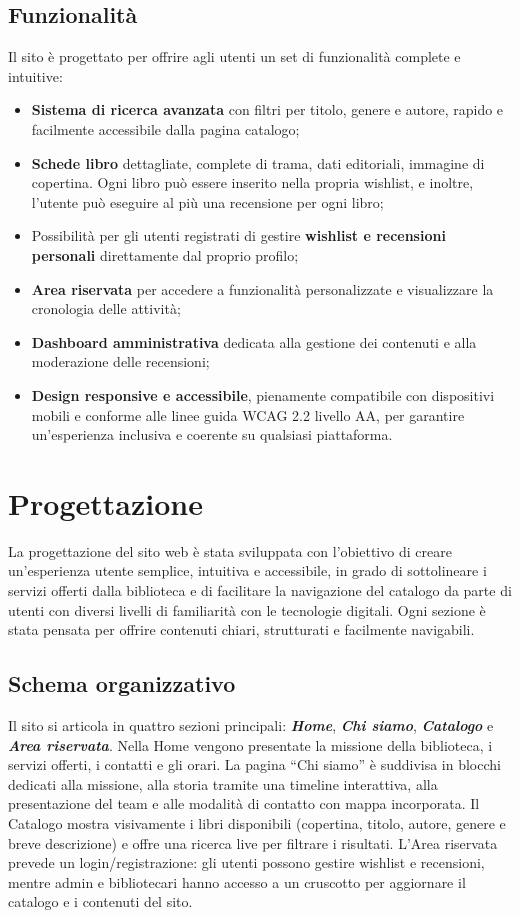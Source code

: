 \documentclass{article}
\begin{document}
\subsection{Funzionalità}
Il sito è progettato per offrire agli utenti un set di funzionalità complete e intuitive:
\begin{itemize}
    \item \textbf{Sistema di ricerca avanzata} con filtri per titolo, genere e autore, rapido e facilmente accessibile dalla pagina catalogo;
    \item \textbf{Schede libro} dettagliate, complete di trama, dati editoriali, immagine di copertina. Ogni libro può essere inserito nella propria wishlist, e inoltre, l'utente può eseguire al più una recensione per ogni libro;
    \item Possibilità per gli utenti registrati di gestire \textbf{wishlist e recensioni personali} direttamente dal proprio profilo;
    \item \textbf{Area riservata} per accedere a funzionalità personalizzate e visualizzare la cronologia delle attività;
    \item \textbf{Dashboard amministrativa} dedicata alla gestione dei contenuti e alla moderazione delle recensioni;
    \item \textbf{Design responsive e accessibile}, pienamente compatibile con dispositivi mobili e conforme alle linee guida WCAG 2.2 livello AA, per garantire un'esperienza inclusiva e coerente su qualsiasi piattaforma.
\end{itemize}


\section{Progettazione}
La progettazione del sito web è stata sviluppata con l'obiettivo di creare un'esperienza utente semplice, intuitiva e accessibile, in grado di sottolineare i servizi offerti dalla biblioteca e di facilitare la navigazione del catalogo da parte di utenti con diversi livelli di familiarità con le tecnologie digitali.
Ogni sezione è stata pensata per offrire contenuti chiari, strutturati e facilmente navigabili.


\subsection{Schema organizzativo}
Il sito si articola in quattro sezioni principali: \emph{\textbf{Home}}, \emph{\textbf{Chi siamo}}, \emph{\textbf{Catalogo}} e \emph{\textbf{Area riservata}}.  
Nella Home vengono presentate la missione della biblioteca, i servizi offerti, i contatti e gli orari.  
La pagina “Chi siamo” è suddivisa in blocchi dedicati alla missione, alla storia tramite una timeline interattiva, alla presentazione del team e alle modalità di contatto con mappa incorporata.  
Il Catalogo mostra visivamente i libri disponibili (copertina, titolo, autore, genere e breve descrizione) e offre una ricerca live per filtrare i risultati.  
L’Area riservata prevede un login/registrazione: gli utenti possono gestire wishlist e recensioni, mentre admin e bibliotecari hanno accesso a un cruscotto per aggiornare il catalogo e i contenuti del sito.
\end{document}
